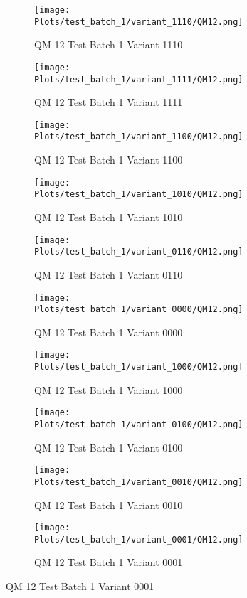 \documentclass{DissertateFigs}
\begin{document}
\begin{figure}[t!]
    \begin{subfigure}{0.47\textwidth}
    \texttt{[image: Plots/test\_batch\_1/variant\_1110/QM12.png]}
    \caption{QM 12 Test Batch 1 Variant 1110}
    \end{subfigure}
    \begin{subfigure}{0.47\textwidth}
    \texttt{[image: Plots/test\_batch\_1/variant\_1111/QM12.png]}
    \caption{QM 12 Test Batch 1 Variant 1111}
    \end{subfigure}

\medskip

    \begin{subfigure}{0.47\textwidth}
    \texttt{[image: Plots/test\_batch\_1/variant\_1100/QM12.png]}
    \caption{QM 12 Test Batch 1 Variant 1100}
    \end{subfigure}
    \begin{subfigure}{0.47\textwidth}
    \texttt{[image: Plots/test\_batch\_1/variant\_1010/QM12.png]}
    \caption{QM 12 Test Batch 1 Variant 1010}
    \end{subfigure}

\medskip

    \begin{subfigure}{0.47\textwidth}
    \texttt{[image: Plots/test\_batch\_1/variant\_0110/QM12.png]}
    \caption{QM 12 Test Batch 1 Variant 0110}
    \end{subfigure}
    \begin{subfigure}{0.47\textwidth}
    \texttt{[image: Plots/test\_batch\_1/variant\_0000/QM12.png]}
    \caption{QM 12 Test Batch 1 Variant 0000}
    \end{subfigure}

\medskip

    \begin{subfigure}{0.47\textwidth}
    \texttt{[image: Plots/test\_batch\_1/variant\_1000/QM12.png]}
    \caption{QM 12 Test Batch 1 Variant 1000}
    \end{subfigure}
    \begin{subfigure}{0.47\textwidth}
    \texttt{[image: Plots/test\_batch\_1/variant\_0100/QM12.png]}
    \caption{QM 12 Test Batch 1 Variant 0100}
    \end{subfigure}

\medskip

    \begin{subfigure}{0.47\textwidth}
    \texttt{[image: Plots/test\_batch\_1/variant\_0010/QM12.png]}
    \caption{QM 12 Test Batch 1 Variant 0010}
    \end{subfigure}
    \begin{subfigure}{0.47\textwidth}
    \texttt{[image: Plots/test\_batch\_1/variant\_0001/QM12.png]}
    \caption{QM 12 Test Batch 1 Variant 0001}
    \end{subfigure}


\end{figure}
\end{document}
